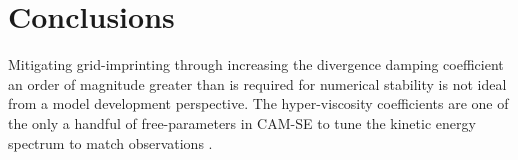 \documentclass{agujournal}
\begin{document}

\section{Conclusions}\label{sec:conclusions}

Mitigating grid-imprinting through increasing the divergence damping coefficient an order of magnitude greater than is required for numerical stability is not ideal from a model development perspective. The hyper-viscosity coefficients are one of the only a handful of free-parameters in CAM-SE to tune the kinetic energy spectrum to match observations \citep{SPKS2014JAS,LetAl2018JAMES}. 




%
%
%
%
\appendix
\end{document}
